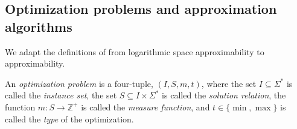 \documentclass[]{article}
\begin{document}
\subsection{Optimization problems and approximation algorithms}

We adapt the definitions of \cite{tantau07} from logarithmic space approximability to \NC{} approximability.

\begin{definition}
  An \emph{optimization problem} is a four-tuple, $(I, S, m, t)$, where the set $I \subseteq \Sigma^*$ is called the \emph{instance set}, the set $S \subseteq I \times \Sigma^*$ is called the \emph{solution relation}, the function $m \colon S \to \mathbb{Z}^+$ is called the \emph{measure function}, and $t \in \{\min, \max\}$ is called the \emph{type} of the optimization.
\end{definition}
\end{document}
